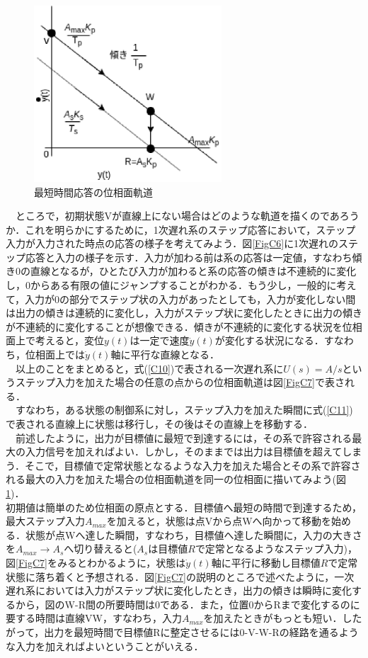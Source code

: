 \documentclass[12pt]{jsarticle}
\begin{document}
\begin{figure}[tb]
  \begin{center}
    \includegraphics[clip,width=7.0cm]{../Img/FigC8.eps}
    \caption{最短時間応答の位相面軌道}
    \label{FigC8}
  \end{center}
\end{figure}
　ところで，初期状態Vが直線上にない場合はどのような軌道を描くのであろうか．これを明らかにするために，1次遅れ系のステップ応答において，ステップ入力が入力された時点の応答の様子を考えてみよう．図\ref{FigC6}に1次遅れのステップ応答と入力の様子を示す．入力が加わる前は系の応答は一定値，すなわち傾き0の直線となるが，ひとたび入力が加わると系の応答の傾きは不連続的に変化し，0からある有限の値にジャンプすることがわかる．もう少し，一般的に考えて，入力が0の部分でステップ状の入力があったとしても，入力が変化しない間は出力の傾きは連続的に変化し，入力がステップ状に変化したときに出力の傾きが不連続的に変化することが想像できる．傾きが不連続的に変化する状況を位相面上で考えると，変位$y(t)$は一定で速度$\dot{y}(t)$が変化する状況になる．すなわち，位相面上では$\dot{y}(t)$軸に平行な直線となる．\\
　以上のことをまとめると，式(\ref{C10})で表される一次遅れ系に$U(s)=A/s$というステップ入力を加えた場合の任意の点からの位相面軌道は図\ref{FigC7}で表される．\\
　すなわち，ある状態の制御系に対し，ステップ入力を加えた瞬間に式(\ref{C11})で表される直線上に状態は移行し，その後はその直線上を移動する．\\
　前述したように，出力が目標値に最短で到達するには，その系で許容される最大の入力信号を加えればよい．しかし，そのままでは出力は目標値を超えてしまう．そこで，目標値で定常状態となるような入力を加えた場合とその系で許容される最大の入力を加えた場合の位相面軌道を同一の位相面に描いてみよう(図\ref{FigC8})．\\
  初期値は簡単のため位相面の原点とする．目標値へ最短の時間で到達するため，最大ステップ入力$A_{max}$を加えると，状態は点Vから点Wへ向かって移動を始める．状態が点Wへ達した瞬間，すなわち，目標値へ達した瞬間に，入力の大きさを$A_{max}→ A_{s}$へ切り替えると($A_s$は目標値$R$で定常となるようなステップ入力)，図\ref{FigC7}をみるとわかるように，状態は$\dot{y}(t)$軸に平行に移動し目標値$R$で定常状態に落ち着くと予想される．図\ref{FigC7}の説明のところで述べたように，一次遅れ系においては入力がステップ状に変化したとき，出力の傾きは瞬時に変化するから，図のW-R間の所要時間は0である．また，位置0からRまで変化するのに要する時間は直線VW，すなわち，入力$A_{max}$を加えたときがもっとも短い．したがって，出力を最短時間で目標値Rに整定させるには0-V-W-Rの経路を通るような入力を加えればよいということがいえる．\\
\end{document}
